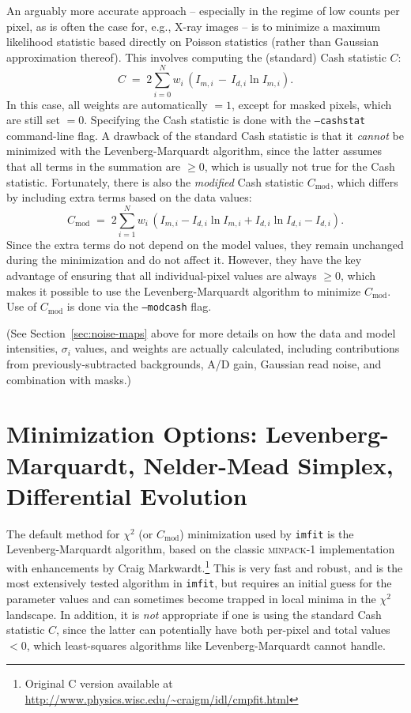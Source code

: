 \documentclass[10pt,a4paper,article]{memoir}
\newcommand{\imfit}{\texttt{imfit}}
\newcommand{\chisquare}{\ensuremath{\chi^{2}}}
\begin{document}
An arguably more accurate approach -- especially in the regime of low counts per pixel,
as is often the case for, e.g., X-ray images -- is to minimize a maximum likelihood 
statistic based directly on Poisson statistics (rather than Gaussian approximation thereof). 
This involves computing the (standard) Cash statistic $C$:
\begin{equation}
C \; = \; 2 \sum_{i = 0}^{N} w_{i} \, (I_{m, i} \, - \, I_{d, i} \ln I_{m, i}) .
\end{equation}
In this case, all weights are automatically $=1$, except for masked pixels, which are still set $= 0$.
Specifying the Cash statistic is done with the \texttt{--cashstat} command-line flag.
A drawback of the standard Cash statistic is that it \textit{cannot} be minimized with the
Levenberg-Marquardt algorithm, since the latter assumes that all terms in the summation are
$\ge 0$, which is usually not true for the Cash statistic.  Fortunately, there is also the 
\textit{modified} Cash statistic $C_{\mathrm{mod}}$, which differs by including extra terms 
based on the data values:
\begin{equation}
C_{\mathrm{mod}} \; = \;  2 \sum_{i = 1}^{N} w_{i} \, 
\left( I_{m, i} - I_{d, i} \ln I_{m, i} + I_{d, i} \ln I_{d, i} - I_{d, i} \right).
\end{equation}
Since the extra terms do not depend on the model values, they remain unchanged during
the minimization and do not affect it. However, they have
the key advantage of ensuring that all individual-pixel values are always $\ge 0$, which
makes it possible to use the Levenberg-Marquardt algorithm to minimize $C_{\mathrm{mod}}$.
Use of $C_{\mathrm{mod}}$ is done via the \texttt{--modcash} flag.

(See Section~\ref{sec:noise-maps} above for more details on how the data
and model intensities, $\sigma_{i}$ values, and weights are actually
calculated, including contributions from previously-subtracted
backgrounds, A/D gain, Gaussian read noise, and combination with masks.)




\section{Minimization Options: Levenberg-Marquardt, Nelder-Mead Simplex, Differential Evolution}

The default method for \chisquare{} (or $C_{\mathrm{mod}}$) minimization
used by \imfit{} is the Levenberg-Marquardt algorithm, based on the
classic \textsc{minpack-1} implementation \citep{more78} with
enhancements by Craig Markwardt.\footnote{Original C version available
at \url{http://www.physics.wisc.edu/~craigm/idl/cmpfit.html}} This is
very fast and robust, and is the most extensively tested algorithm in
\imfit, but requires an initial guess for the parameter values and can
sometimes become trapped in local minima in the \chisquare{} landscape.
In addition, it is \textit{not} appropriate if one is using the standard
Cash statistic $C$, since the latter can potentially have both per-pixel
and total values $< 0$, which least-squares algorithms like Levenberg-Marquardt cannot
handle.
\end{document}
